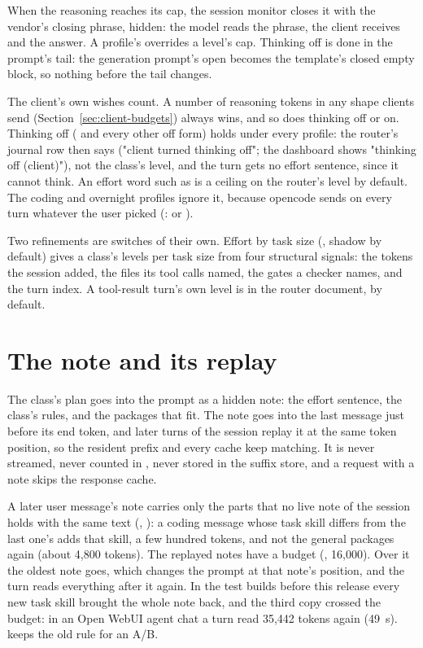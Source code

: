 When the reasoning reaches its cap, the session monitor closes it with the vendor's closing phrase, hidden: the model reads the phrase, the client receives  and the answer. A profile's  overrides a level's cap. Thinking off is done in the prompt's tail: the generation prompt's open  becomes the template's closed empty block, so nothing before the tail changes.

The client's own wishes count. A number of reasoning tokens in any shape clients send (Section~\ref{sec:client-budgets}) always wins, and so does thinking off or on. Thinking off ( and every other off form) holds under every profile: the router's journal row then says  ("client turned thinking off"; the dashboard shows "thinking off (client)"), not the class's level, and the turn gets no effort sentence, since it cannot think. An effort word such as  is a ceiling on the router's level by default. The coding and overnight profiles ignore it, because opencode sends  on every turn whatever the user picked (:  or ).

Two refinements are switches of their own. Effort by task size (, shadow by default) gives a class's levels per task size from four structural signals: the tokens the session added, the files its tool calls named, the gates a checker names, and the turn index. A tool-result turn's own level is  in the router document,  by default.

\section{The note and its replay}

The class's plan goes into the prompt as a hidden note: the effort sentence, the class's rules, and the packages that fit. The note goes into the last message just before its end token, and later turns of the session replay it at the same token position, so the resident prefix and every cache keep matching. It is never streamed, never counted in , never stored in the suffix store, and a request with a note skips the response cache.

A later user message's note carries only the parts that no live note of the session holds with the same text (, ): a coding message whose task skill differs from the last one's adds that skill, a few hundred tokens, and not the general packages again (about 4,800 tokens). The replayed notes have a budget (, 16,000). Over it the oldest note goes, which changes the prompt at that note's position, and the turn reads everything after it again. In the test builds before this release every new task skill brought the whole note back, and the third copy crossed the budget: in an Open WebUI agent chat a turn read 35,442 tokens again (49~s).  keeps the old rule for an A/B.

